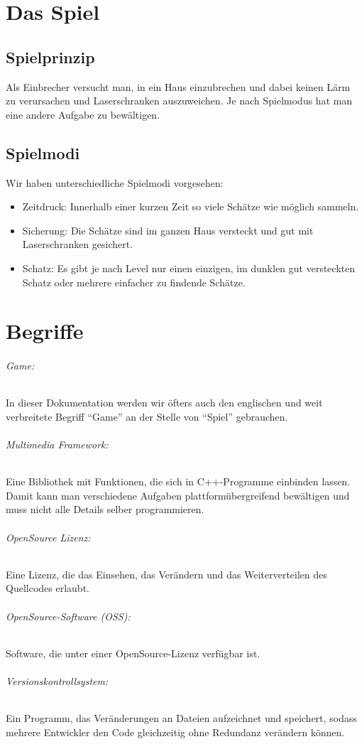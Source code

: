 \documentclass[11pt,a4paper]{scrbook}
\newcommand{\q}[1]{``#1''}
\begin{document}
\chapter{Das Spiel}
\section{Spielprinzip}
Als Einbrecher versucht man, in ein Haus einzubrechen und dabei keinen Lärm zu verursachen und Laserschranken auszuweichen. Je nach Spielmodus hat man eine andere Aufgabe zu bewältigen.

\section{Spielmodi}
Wir haben unterschiedliche Spielmodi vorgesehen:
\begin{itemize}
\item Zeitdruck: Innerhalb einer kurzen Zeit so viele Schätze wie möglich sammeln.
\item Sicherung: Die Schätze sind im ganzen Haus versteckt und gut mit Laserschranken gesichert.
\item Schatz: Es gibt je nach Level nur einen einzigen, im dunklen gut versteckten Schatz oder mehrere einfacher zu findende Schätze.
\end{itemize}


\chapter{Begriffe}
\subparagraph{Game:}
In dieser Dokumentation werden wir öfters auch den englischen und weit verbreitete Begriff \q{Game} an der Stelle von \q{Spiel} gebrauchen.

\subparagraph{Multimedia Framework:}
Eine Bibliothek mit Funktionen, die sich in C++-Programme einbinden lassen. Damit kann man verschiedene Aufgaben plattformübergreifend bewältigen und muss nicht alle Details selber programmieren.

\subparagraph{OpenSource Lizenz:}

Eine Lizenz, die das Einsehen, das Verändern und das Weiterverteilen des Quellcodes erlaubt.

\subparagraph{OpenSource-Software (OSS):}
Software, die unter einer OpenSource-Lizenz verfügbar ist.

\subparagraph{Versionskontrollsystem:}
Ein Programm, das Veränderungen an Dateien aufzeichnet und speichert, sodass mehrere Entwickler den Code gleichzeitig ohne Redundanz verändern können.
\end{document}
